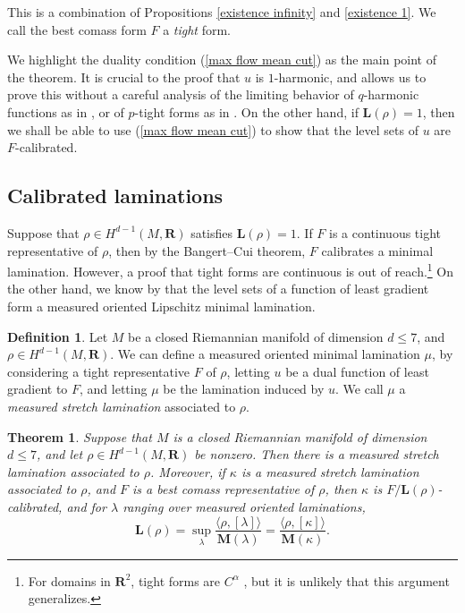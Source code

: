\documentclass[reqno,11pt]{amsart}
\newcommand{\RR}{\mathbf{R}}
\newcommand{\Mass}{\mathbf M}
\newcommand{\Comass}{\mathbf L}
\newcommand{\dfn}[1]{\emph{#1}\index{#1}}
\newtheorem{mainthm}{Theorem}
\theoremstyle{definition}
\newtheorem{definition}[theorem]{Definition}
\numberwithin{equation}{section}
\begin{document}
This is a combination of Propositions \ref{existence infinity} and \ref{existence 1}.
We call the best comass form $F$ a \dfn{tight} form.

We highlight the duality condition (\ref{max flow mean cut}) as the main point of the theorem.
It is crucial to the proof that $u$ is $1$-harmonic, and allows us to prove this without a careful analysis of the limiting behavior of $q$-harmonic functions as in \cite[Theorem 2.4]{Mazon14}, or of $p$-tight forms as in \cite[\S6]{daskalopoulos2020transverse}.
On the other hand, if $\Comass(\rho) = 1$, then we shall be able to use (\ref{max flow mean cut}) to show that the level sets of $u$ are $F$-calibrated.

\subsection{Calibrated laminations}
Suppose that $\rho \in H^{d - 1}(M, \RR)$ satisfies $\Comass(\rho) = 1$.
If $F$ is a continuous tight representative of $\rho$, then by the Bangert--Cui theorem, $F$ calibrates a minimal lamination.
However, a proof that tight forms are continuous is out of reach.\footnote{For domains in $\RR^2$, tight forms are $C^\alpha$ \cite{Evans08}, but it is unlikely that this argument generalizes.}
On the other hand, we know by \cite[Theorem B]{BackusCML} that the level sets of a function of least gradient form a measured oriented Lipschitz minimal lamination.

\begin{definition}
Let $M$ be a closed Riemannian manifold of dimension $d \leq 7$, and $\rho \in H^{d - 1}(M, \RR)$.
We can define a measured oriented minimal lamination $\mu$, by considering a tight representative $F$ of $\rho$, letting $u$ be a dual function of least gradient to $F$, and letting $\mu$ be the lamination induced by $u$.
We call $\mu$ a \dfn{measured stretch lamination} associated to $\rho$.
\end{definition}

\begin{mainthm}\label{lams are calibrated}
Suppose that $M$ is a closed Riemannian manifold of dimension $d \leq 7$, and let $\rho \in H^{d - 1}(M, \RR)$ be nonzero.
Then there is a measured stretch lamination associated to $\rho$.
Moreover, if $\kappa$ is a measured stretch lamination associated to $\rho$, and $F$ is a best comass representative of $\rho$, then $\kappa$ is $F/\Comass(\rho)$-calibrated, and for $\lambda$ ranging over measured oriented laminations,
\begin{equation}\label{duality between stable and comass}
\Comass(\rho) = \sup_\lambda \frac{\langle \rho, [\lambda]\rangle}{\Mass(\lambda)} = \frac{\langle \rho, [\kappa]\rangle}{\Mass(\kappa)}.
\end{equation}
\end{mainthm}
\end{document}
